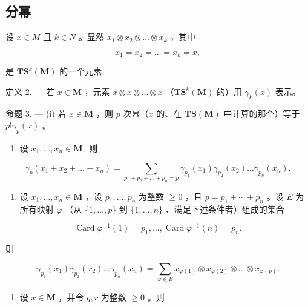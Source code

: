 \subsection{分幂}

设 \(x \in M\) 且 \(k \in N\) 。显然 \(x_1 \otimes x_2 \otimes \ldots \otimes x_k\) ，其中

\[
x _ {1} = x _ {2} = \dots = x _ {k} = x,
\]

是 \(\mathbf{TS}^k (\mathbf{M})\) 的一个元素

定义 2. --- 若 \(x \in \mathbf{M}\) ，元素 \(x \otimes x \otimes \ldots \otimes x\) （\(\mathbf{T}\mathbf{S}^k(\mathbf{M})\) 的）用 \(\gamma_k(x)\) 表示。

命题 3. --- (i) 若 \(x \in \mathbf{M}\) ，则 \(p\) 次幂（\(x\) 的、在 \(\mathbf{T}\mathbf{S}(\mathbf{M})\) 中计算的那个）等于 \(p! \gamma_p(x)\) 。

\begin{enumerate}
\def\labelenumi{(\roman{enumi})}
\setcounter{enumi}{1}
\tightlist
\item
  设 \(x_{1},\ldots ,x_{n}\in \mathbf{M};\) 则
\end{enumerate}

\[
\gamma_ {p} \left(x _ {1} + x _ {2} + \dots + x _ {n}\right) = \sum_ {p _ {1} + p _ {2} + \dots + p _ {n} = p} \gamma_ {p _ {1}} \left(x _ {1}\right) \gamma_ {p _ {2}} \left(x _ {2}\right) \dots \gamma_ {p _ {n}} \left(x _ {n}\right).
\]

\begin{enumerate}
\def\labelenumi{(\roman{enumi})}
\setcounter{enumi}{2}
\tightlist
\item
  设 \(x_1, \ldots, x_n \in \mathbf{M}\) ，设 \(p_1, \ldots, p_n\) 为整数 \(\geqslant 0\) ，且 \(p = p_1 + \cdots + p_n\) 。设 \(E\) 为所有映射 \(\varphi\) （从 \(\{1, \ldots, p\}\) 到 \(\{1, \ldots, n\}\) 、满足下述条件者）组成的集合
\end{enumerate}

\[
\operatorname{Card} \varphi^ {- 1} (1) = p _ {1}, \dots , \operatorname{Card} \varphi^ {- 1} (n) = p _ {n}.
\]

则

\[
\gamma_ {p _ {1}} (x _ {1}) \gamma_ {p _ {2}} (x _ {2}) \dots \gamma_ {p _ {n}} (x _ {n}) = \sum_ {\varphi \in E} x _ {\varphi (1)} \otimes x _ {\varphi (2)} \otimes \dots \otimes x _ {\varphi (p)}.
\]

\begin{enumerate}
\def\labelenumi{(\roman{enumi})}
\setcounter{enumi}{3}
\tightlist
\item
  设 \(x \in \mathbf{M}\) ，并令 \(q, r\) 为整数 \(\geqslant 0\) 。则
\end{enumerate}

